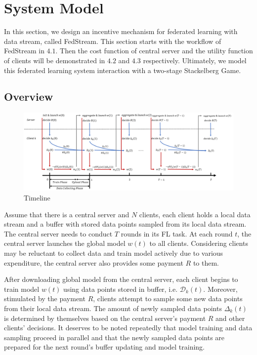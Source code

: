 \documentclass{article}
\theoremstyle{plain}
\theoremstyle{definition}
\theoremstyle{remark}
\begin{document}
\section{System Model}
In this section, we design an incentive mechanism for federated learning with data stream, called FedStream.
This section starts with the workflow of FedStream in $4.1$. Then the cost function of central server and the utility function of clients will be demonstrated in $4.2$ and $4.3$ respectively.
Ultimately, we model this federated learning system interaction with a two-stage Stackelberg Game.
\subsection{Overview}
\begin{figure}[ht]
  \centering
  \includegraphics[width=\columnwidth]{figures/figure_17.png}
  \caption{Timeline}
\end{figure}
Assume that there is a central server and $N$ clients, each client holds a local data stream and a buffer with stored data points sampled from its local data stream. 
The central server needs to conduct $T$ rounds in its FL task. 
At each round $t$, the central server launches the global model $w(t)$ to all clients.
Considering clients may be reluctant to collect data and train model actively due to various expenditure, the central server also provides some payment $R$ to them.

After downloading global model from the central server, each client begins to train model $w(t)$ using data points stored in buffer, i.e. $\mathcal{D}_k(t)$. 
Moreover, stimulated by the payment $R$, clients attempt to sample some new data points from their local data stream.
The amount of newly sampled data points $\Delta_k(t)$ is determined by themselves based on the central server's payment $R$ and other clients' decisions.
It deserves to be noted repeatedly that model training and data sampling proceed in parallel and that the newly sampled data points are prepared for the next round's buffer updating and model training.
\end{document}
